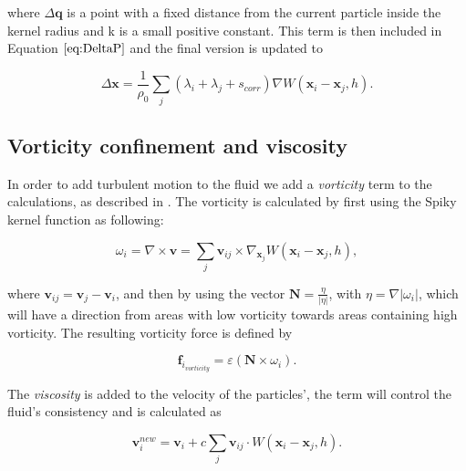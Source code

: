 where $\Delta \mathbf{q}$ is a point with a fixed distance from the current particle inside the kernel
radius and k is a small positive constant. This term is then included in
Equation $\ref{eq:DeltaP}$ and the final version is updated to

\begin{equation}
\label{eq:DeltaPscorr}
\Delta \mathbf{x} = \frac{1}{\rho_0} \sum\limits_{j} (\lambda_i + \lambda_j + s_{corr}) \nabla W(\mathbf{x}_i - \mathbf{x}_j, h).
\end{equation}

\subsection{Vorticity confinement and viscosity} In order to add turbulent
motion to the fluid we add a \textit{vorticity} term to the calculations, as
described in \cite{macklin2013position}. The vorticity is calculated by first
using the Spiky kernel function as following:

\begin{equation}
\label{eq:Omega}
\omega_{i} = \nabla \times \mathbf{v} =  \sum\limits_{j} \mathbf{v}_{ij} \times \nabla_{\mathbf{x}_{j}} W(\mathbf{x}_{i} - \mathbf{x}_{j}, h),
\end{equation}

where $\mathbf{v}_{ij} = \mathbf{v}_{j} - \mathbf{v}_{i}$, and then by using the
vector $\mathbf{N} = \frac{\eta}{|\eta|}$, with $\eta = \nabla|\omega_{i}|$,
which will have a direction from areas with low vorticity towards areas
containing high vorticity. The resulting vorticity force is defined by

\begin{equation}
\label{eq:Vorticity}
\mathbf{f}_{i_{vorticity}} = \varepsilon \left(\mathbf{N} \times \omega_{i} \right).
\end{equation}

The \textit{viscosity} is added to the velocity of the particles', the term
will control the fluid's consistency and is calculated as

\begin{equation}
\label{eq:Viscosity}
\mathbf{v}_{i}^{new} = \mathbf{v}_{i} + c \sum\limits_{j} \mathbf{v}_{ij} \cdot W(\mathbf{x}_i - \mathbf{x}_j, h).
\end{equation}


